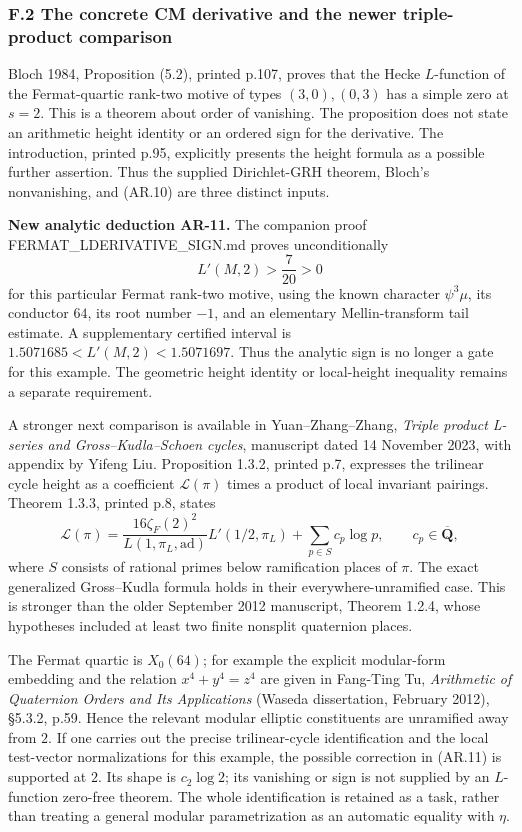 \subsubsection{F.2 The concrete CM derivative and the newer
triple-product
comparison}\label{f.2-the-concrete-cm-derivative-and-the-newer-triple-product-comparison}

Bloch 1984, Proposition (5.2), printed p.107, proves that the Hecke
\(L\)-function of the Fermat-quartic rank-two motive of types
\((3,0),(0,3)\) has a simple zero at \(s=2\). This is a theorem about
order of vanishing. The proposition does not state an arithmetic height
identity or an ordered sign for the derivative. The introduction,
printed p.95, explicitly presents the height formula as a possible
further assertion. Thus the supplied Dirichlet-GRH theorem, Bloch's
nonvanishing, and (AR.10) are three distinct inputs.

\textbf{New analytic deduction AR-11.} The companion proof
FERMAT\_LDERIVATIVE\_SIGN.md proves unconditionally \[
L'(M,2)>\frac7{20}>0
\] for this particular Fermat rank-two motive, using the known character
\(\psi^3\mu\), its conductor \(64\), its root number \(-1\), and an
elementary Mellin-transform tail estimate. A supplementary certified
interval is \(1.5071685<L'(M,2)<1.5071697\). Thus the analytic sign is
no longer a gate for this example. The geometric height identity or
local-height inequality remains a separate requirement.

A stronger next comparison is available in Yuan--Zhang--Zhang,
\emph{Triple product L-series and Gross--Kudla--Schoen cycles},
manuscript dated 14 November 2023, with appendix by Yifeng Liu.
Proposition 1.3.2, printed p.7, expresses the trilinear cycle height as
a coefficient \(\mathcal L(\pi)\) times a product of local invariant
pairings. Theorem 1.3.3, printed p.8, states \[
\mathcal L(\pi)=
\frac{16\zeta_F(2)^2}{L(1,\pi_L,\mathrm{ad})}
 L'(1/2,\pi_L)+\sum_{p\in S}c_p\log p,
\qquad c_p\in\overline{\mathbf Q},
\tag{AR.11}
\] where \(S\) consists of rational primes below ramification places of
\(\pi\). The exact generalized Gross--Kudla formula holds in their
everywhere-unramified case. This is stronger than the older September
2012 manuscript, Theorem 1.2.4, whose hypotheses included at least two
finite nonsplit quaternion places.

The Fermat quartic is \(X_0(64)\); for example the explicit modular-form
embedding and the relation \(x^4+y^4=z^4\) are given in Fang-Ting Tu,
\emph{Arithmetic of Quaternion Orders and Its Applications} (Waseda
dissertation, February 2012), §5.3.2, p.59. Hence the relevant modular
elliptic constituents are unramified away from \(2\). If one carries out
the precise trilinear-cycle identification and the local test-vector
normalizations for this example, the possible correction in (AR.11) is
supported at \(2\). Its shape is \(c_2\log2\); its vanishing or sign is
not supplied by an \(L\)-function zero-free theorem. The whole
identification is retained as a task, rather than treating a general
modular parametrization as an automatic equality with \(\eta\).

